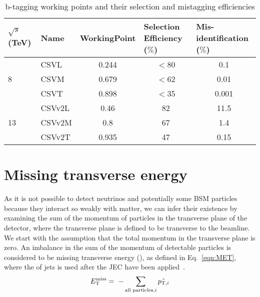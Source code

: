\begin{table}[htpb!]
\footnotesize
\begin{center}
\begin{tabular}{l|l|c|c|c}
$\sqrt{s}$ (TeV)    & Name   & \multicolumn{1}{l|}{WorkingPoint} & \multicolumn{1}{l|}{Selection Efficiency ($\%$)} & \multicolumn{1}{l}{Mis-identification ($\%$)} \\ \hline
\multirow{3}{*}{8}  & CSVL   & 0.244                             & $<$80                                                 & 0.1                                               \\ \cline{2-5} 
                    & CSVM   & 0.679                             & $<$62                                                 & 0.01                                   \\ \cline{2-5} 
                    & CSVT   & 0.898                             & $<$35                                               & 0.001                                               \\ \hline
\multirow{3}{*}{13} & CSVv2L & 0.46                              & 82                                               & 11.5                                          \\ \cline{2-5} 
                    & CSVv2M & 0.8                               & 67                                               & 1.4                                           \\ \cline{2-5} 
                    & CSVv2T & 0.935                             & 47                                               & 0.15                                         
\end{tabular}
\caption{b-tagging working points and their selection and mistagging efficiencies}
\label{tab:btag}
\end{center}
\end{table}


\section{Missing transverse energy ~\label{sec:METreco}}
As it is not possible to detect neutrinos and potentially some BSM particles because they interact so weakly with matter, we can infer their existence by examining the sum of the momentum of particles in the transverse plane of the detector, where the transverse plane is defined to be transverse to the beamline. We start with the assumption that the total momentum in the transverse plane is zero. An imbalance in the sum of the momentum of detectable particles is considered to be missing transverse energy (\ETmiss), as defined in Eq.~\ref{eqn:MET}, where the \pt of jets is used after the JEC have been applied~\cite{CMS:2016ljj}.
\begin{equation}
E_{\mathrm{T}}^{\text{miss}} = ~- \sum_{\textrm{all particles,}i} \hat{ {p}_{\textrm{T},i} }
\label{eqn:MET}
\end{equation}

